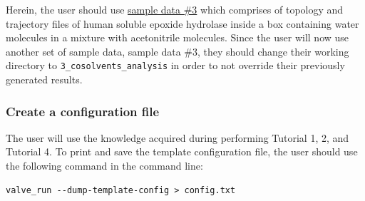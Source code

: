 \documentclass[9pt,tutorial]{livecoms}
\begin{document}
Herein, the user should use \href{http://www.aquaduct.pl/sample-data/}{sample data \#3} which comprises of topology and trajectory files of human soluble epoxide hydrolase inside a box containing water molecules in a mixture with acetonitrile molecules. Since the user will now use another set of sample data, sample data \#3, they should change their working directory to \texttt{3\_cosolvents\_analysis} in order to not override their previously generated results.

\subsubsection{Create a configuration file}
The user will use the knowledge acquired during performing Tutorial 1, 2, and Tutorial 4. To print and save the template configuration file, the user should use the following command in the command line:
\begin{lstlisting}[columns=fullflexible]
valve_run --dump-template-config > config.txt
\end{lstlisting}
\end{document}
